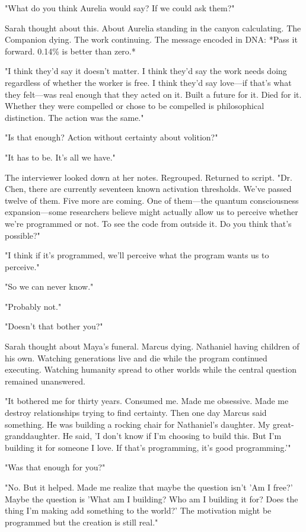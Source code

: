 "What do you think Aurelia would say? If we could ask them?"

Sarah thought about this. About Aurelia standing in the canyon calculating. The Companion dying. The work continuing. The message encoded in DNA: *Pass it forward. 0.14\% is better than zero.*

"I think they'd say it doesn't matter. I think they'd say the work needs doing regardless of whether the worker is free. I think they'd say love—if that's what they felt—was real enough that they acted on it. Built a future for it. Died for it. Whether they were compelled or chose to be compelled is philosophical distinction. The action was the same."

"Is that enough? Action without certainty about volition?"

"It has to be. It's all we have."

The interviewer looked down at her notes. Regrouped. Returned to script. "Dr. Chen, there are currently seventeen known activation thresholds. We've passed twelve of them. Five more are coming. One of them—the quantum consciousness expansion—some researchers believe might actually allow us to perceive whether we're programmed or not. To see the code from outside it. Do you think that's possible?"

"I think if it's programmed, we'll perceive what the program wants us to perceive."

"So we can never know."

"Probably not."

"Doesn't that bother you?"

Sarah thought about Maya's funeral. Marcus dying. Nathaniel having children of his own. Watching generations live and die while the program continued executing. Watching humanity spread to other worlds while the central question remained unanswered.

"It bothered me for thirty years. Consumed me. Made me obsessive. Made me destroy relationships trying to find certainty. Then one day Marcus said something. He was building a rocking chair for Nathaniel's daughter. My great-granddaughter. He said, 'I don't know if I'm choosing to build this. But I'm building it for someone I love. If that's programming, it's good programming.'"

"Was that enough for you?"

"No. But it helped. Made me realize that maybe the question isn't 'Am I free?' Maybe the question is 'What am I building? Who am I building it for? Does the thing I'm making add something to the world?' The motivation might be programmed but the creation is still real."

